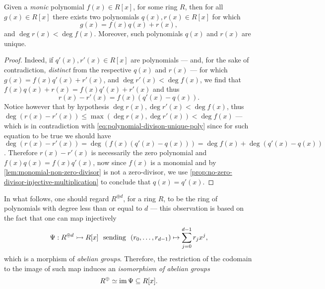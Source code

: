 \begin{lemma}
\label{lem:division-of-polynomials}
Given a \emph{monic} polynomial \(f(x) \in R[x]\), for some ring \(R\), then for
all \(g(x) \in R[x]\) there exists two polynomials \(q(x), r(x) \in R[x]\) for
which
\[
g(x) = f(x) q(x) + r(x),
\]
and \(\deg r(x) < \deg f(x)\). Moreover, such polynomials \(q(x)\) and \(r(x)\)
are unique.
\end{lemma}

\begin{proof}
Indeed, if \(q'(x), r'(x) \in R[x]\) are polynomials --- and, for the sake of
contradiction, \emph{distinct} from the respective \(q(x)\) and \(r(x)\) --- for
which \(g(x) = f(x) q'(x) + r'(x)\), and \(\deg r'(x) < \deg f(x)\), we find
that \(f(x) q(x) + r(x) = f(x) q'(x) + r'(x)\) and thus
\begin{equation}\label{eq:polynomial-divison-unique-poly}
r(x) - r'(x) = f(x) (q'(x) - q(x)).
\end{equation}
Notice however that by hypothesis \(\deg r(x), \deg r'(x) < \deg f(x)\), thus
\(\deg(r(x) - r'(x)) \leq \max(\deg r(x), \deg r'(x)) < \deg f(x)\) --- which is
in contradiction with \cref{eq:polynomial-divison-unique-poly} since for such
equation to be true we should have
\(\deg(r(x) - r'(x)) = \deg(f(x) (q'(x) - q(x))) = \deg f(x) + \deg(q'(x) -
q(x))\). Therefore \(r(x) - r'(x)\) is necessarily the zero polynomial and
\(f(x) q(x) = f(x) q'(x)\), now since \(f(x)\) is a monomial and by
\cref{lem:monomial-non-zero-divisor} is not a zero-divisor, we use
\cref{prop:no-zero-divisor-injective-multiplication} to conclude that
\(q(x) = q'(x)\).
\end{proof}

In what follows, one should regard \(R^{\oplus d}\), for a ring \(R\), to be the
ring of polynomials with degree less than or equal to \(d\) --- this observation
is based on the fact that one can map injectively
\begin{equation}\label{eq:embedding-Rd-in-R[x]}
\Psi: R^{\oplus d} \rightarrowtail R[x]\ \text{ sending }\
(r_0, \dots, r_{d-1}) \mapsto \sum_{j=0}^{d-1} r_j x^j,
\end{equation}
which is a morphism of \emph{abelian groups}. Therefore, the restriction of the
codomain to the image of such map induces an \emph{isomorphism of abelian
groups}
\begin{equation}\label{eq:iso-Rd-in-R[x]}
R^{\oplus} \simeq \operatorname{im} \Psi \subseteq R[x].
\end{equation}

